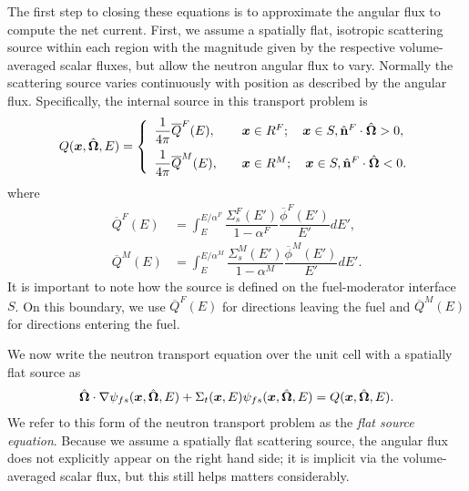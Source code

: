 The first step to closing these equations is to approximate the angular flux to compute the net current. First, we assume a spatially flat, isotropic scattering source within each region with the magnitude given by the respective volume-averaged scalar fluxes, but allow the neutron angular flux to vary. Normally the scattering source varies continuously with position as described by the angular flux. Specifically, the internal source in this transport problem is
\begin{align}
  Q(\pos,\dir,E) = \left\{ \begin{array}{l l}
  \dfrac{1}{4\pi} \overline{Q}^F(E), & \quad \pos \in R^F; \quad \pos \in S, \nhat^F \cdot \dir > 0, \vspace{0.2cm} \\ 
  \dfrac{1}{4\pi} \overline{Q}^M(E), & \quad \pos \in R^M; \quad \pos \in S, \nhat^F \cdot \dir < 0. \\ \end{array} \right.
\end{align}
where
\begin{subequations} \label{Eq:thermalization_flatScatteringSources_Qbar}
\begin{align}
  \overline{Q}^F(E) &= \displaystyle\int_E^{E/\alpha^F} \dfrac{ \Sigma_s^F(E') }{ 1 - \alpha^F } \dfrac{ \overline{\phi}^F(E') }{ E' } dE', \\
  \overline{Q}^M(E) &= \displaystyle\int_E^{E/\alpha^M} \dfrac{ \Sigma_s^M(E') }{ 1 - \alpha^M } \dfrac{ \overline{\phi}^M(E') }{ E' } dE'.
\end{align}
\end{subequations}
It is important to note how the source is defined on the fuel-moderator interface $S$. On this boundary, we use $\overline{Q}^F(E)$ for directions leaving the fuel and $\overline{Q}^M(E)$ for directions entering the fuel.

We now write the neutron transport equation over the unit cell with a spatially flat source as
\begin{align}
  \hat{\mathbf{\Omega}} \cdot \nabla \psi_{fs}(\bm{x},\hat{\mathbf{\Omega}},E) + \Sigma_t(\bm{x},E) \psi_{fs}(\bm{x},\hat{\mathbf{\Omega}},E) = Q(\bm{x},\hat{\mathbf{\Omega}},E). \label{Eq:thermalization_flatSourceEquation_initialForm}
\end{align}
We refer to this form of the neutron transport problem as the \emph{flat source equation}. Because we assume a spatially flat scattering source, the angular flux does not explicitly appear on the right hand side; it is implicit via the volume-averaged scalar flux, but this still helps matters considerably.

